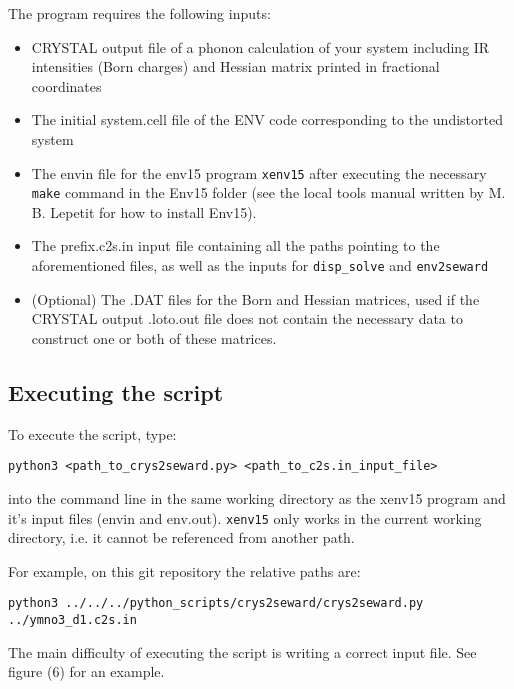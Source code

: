 The program requires the following inputs:

\begin{itemize}
	
	\item CRYSTAL output file of a phonon calculation of your system including IR intensities (Born charges) and Hessian matrix printed in fractional coordinates
	\item The initial system.cell file of the ENV code corresponding to the undistorted system
	\item The envin file for the env15 program \texttt{xenv15} after executing the necessary \texttt{make} command in the Env15 folder (see the local tools manual written by M. B. Lepetit for how to install Env15).
	\item The prefix.c2s.in input file containing all the paths pointing to the aforementioned files, as well as the inputs for \texttt{disp\_solve} and \texttt{env2seward}
	
	\item (Optional) The .DAT files for the Born and Hessian matrices, used if the CRYSTAL output .loto.out file does not contain the necessary data to construct one or both of these matrices.
\end{itemize}


\subsection{Executing the script}

To execute the script, type:

\texttt{python3 <path\_to\_crys2seward.py> <path\_to\_c2s.in\_input\_file>}

into the command line in the same working directory as the xenv15 program and it's input files (envin and env.out).
\texttt{xenv15} only works in the current working directory, i.e. it cannot be referenced from another path.

For example, on this git repository the relative paths are:

\texttt{python3 ../../../python\_scripts/crys2seward/crys2seward.py ../ymno3\_d1.c2s.in}

The main difficulty of executing the script is writing a correct input file. See figure (6) for an example.

